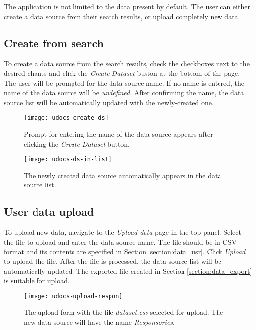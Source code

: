 The application is not limited to the data present by default. The user can either create a data source from their search results, or upload
completely new data.

\subsection{Create from search}

To create a data source from the search results, check the checkboxes next to the desired chants and click the \emph{Create Dataset} button at the bottom
of the page. The user will be prompted for the data source name. If no name is entered, the name of the data source will be \emph{undefined}. After confirming
the name, the data source list will be automatically updated with the newly-created one.

\begin{figure}[!h]
\centering
\texttt{[image: udocs-create-ds]}
\caption{Prompt for entering the name of the data source appears after clicking the \emph{Create Dataset} button.}
\label{fig:create-ds}
\end{figure}

\begin{figure}[!h]
\centering
\texttt{[image: udocs-ds-in-list]}
\caption{The newly created data source automatically appears in the data source list.}
\label{fig:update-ds-antiphons}
\end{figure}

\subsection{User data upload}

To upload new data, navigate to the \emph{Upload data} page in the top panel. Select the file to upload and enter the data source name. The file should be
in CSV format and its contents are specified in Section \ref{section:data_usr}. Click \emph{Upload} to upload the file. After the file is processed, the data source list will
be automatically updated. The exported file created in Section \ref{section:data_export} is suitable for upload.

\begin{figure}[!h]
\centering
\texttt{[image: udocs-upload-respon]}
\caption{The upload form with the file \emph{dataset.csv} selected for upload. The new data source will have the name \emph{Responsories}.}
\label{fig:upload-ds}
\end{figure}

